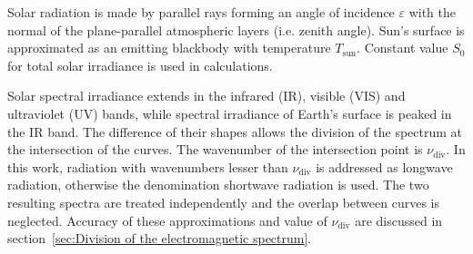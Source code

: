 \documentclass[a4paper,10pt,twocolumn,\classoptions]{article}
\begin{document}
Solar radiation is made by parallel rays forming an angle of incidence $\varepsilon$ with the normal of the plane-parallel atmospheric layers (i.e. zenith angle). %
Sun's surface is approximated as an emitting blackbody with temperature $T_\text{sun}$. Constant value $S_0$ for total solar irradiance is used in calculations.

Solar spectral irradiance extends in the infrared (IR), visible (VIS) and ultraviolet (UV) bands, while spectral irradiance of Earth's surface is peaked in the IR band. The difference of their shapes allows the division of the spectrum at the intersection of the curves. The wavenumber of the intersection point is $\nu_\text{div}$. In this work, radiation with wavenumbers lesser than $\nu_\text{div}$ is addressed as longwave radiation, otherwise the denomination shortwave radiation is used. The two resulting spectra are treated independently and the overlap between curves is neglected. Accuracy of these approximations and value of $\nu_\text{div}$ are discussed in section~\ref{sec:Division of the electromagnetic spectrum}.
\end{document}
